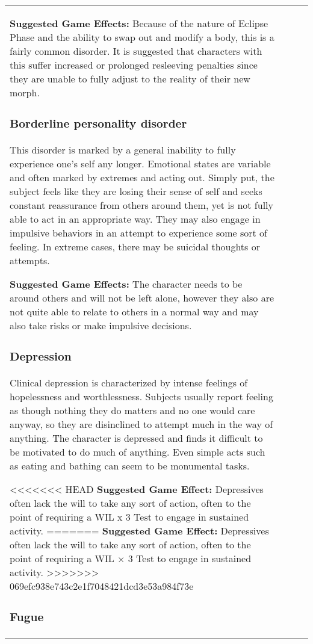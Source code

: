 \begin{table}
\begin{tabular}{|p{8cm}|r|r|r|}
\textbf{Suggested Game Effects:} Because of the nature of Eclipse Phase and the ability to swap out and modify a body, this is a fairly common disorder. It is suggested that characters with this suffer increased or prolonged resleeving penalties since they are unable to fully adjust to the reality of their new morph. 

\subsubsection{Borderline personality disorder} 

This disorder is marked by a general inability to fully experience one’s self any longer. Emotional states are variable and often marked by extremes and acting out. Simply put, the subject feels like they are losing their sense of self and seeks constant reassurance from others around them, yet is not fully able to act in an appropriate way. They may also engage in impulsive behaviors in an attempt to experience some sort of feeling. In extreme cases, there may be suicidal thoughts or attempts. 

\textbf{Suggested Game Effects:} The character needs to be around others and will not be left alone, however they also are not quite able to relate to others in a normal way and may also take risks or make impulsive decisions. 

\subsubsection{Depression} 

Clinical depression is characterized by intense feelings of hopelessness and worthlessness. Subjects usually report feeling as though nothing they do matters and no one would care anyway, so they are disinclined to attempt much in the way of anything. The character is depressed and finds it difficult to be motivated to do much of anything. Even simple acts such as eating and bathing can seem to be monumental tasks. 

<<<<<<< HEAD \textbf{Suggested Game Effect:} Depressives often lack the will to take any sort of action, often to the point of requiring a WIL x 3 Test to engage in sustained activity. ======= \textbf{Suggested Game Effect:} Depressives often lack the will to take any sort of action, often to the point of requiring a WIL $\times$ 3 Test to engage in sustained activity. >>>>>>> 069efc938e743c2e1f7048421dcd3e53a984f73e 

\subsubsection{Fugue} 


\end{tabular}
\end{table}
